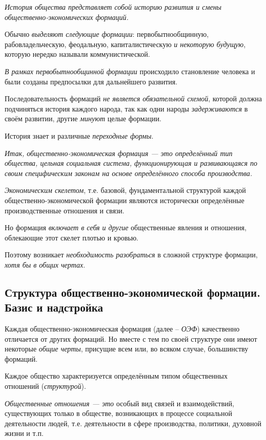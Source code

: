 \documentclass[a4paper,14pt,russian]{extreport}
\begin{document}
\emph{История общества представляет собой историю развития и смены общественно-экономических формаций.}

Обычно \emph{выделяют следующие формации}: первобытнообщинную, рабовладельческую, феодальную, капиталистическую \emph{и некоторую будущую}, которую нередко называли коммунистической.

\emph{В рамках первобытнообщинной формации} происходило становление человека и были созданы предпосылки для дальнейшего развития.

Последовательность формаций \emph{не является обязательной схемой}, которой должна подчиняться история каждого народа, так как одни народы \emph{задерживаются} в своём развитии, другие \emph{минуют} целые формации.

История знает и различные \emph{переходные формы}.

\emph{Итак, общественно-экономическая формация --- это определённый тип общества, цельная социальная система, функционирующая и развивающаяся по своим специфическим законам на основе определённого способа производства.}

\emph{Экономическим скелетом}, т.е. базовой, фундаментальной структурой каждой общественно-экономической формации являются исторически определённые производственные отношения и связи.

Но формация \emph{включает в себя и другие} общественные явления и отношения, облекающие этот скелет плотью и кровью.

Поэтому возникает \emph{необходимость разобраться} в сложной структуре формации, \emph{хотя бы в общих чертах}.

\subsection{Структура общественно-экономической формации. Базис и надстройка}

Каждая общественно-экономическая формация (далее -- \emph{ОЭФ}) качественно отличается от других формаций. Но вместе с тем по своей структуре они имеют некоторые \emph{общие черты}, присущие всем или, во всяком случае, большинству формаций.

Каждое общество характеризуется определённым типом общественных отношений (\emph{структурой}).

\emph{Общественные отношения --- это} особый вид связей и взаимодействий, существующих только в обществе, возникающих в процессе социальной деятельности людей, т.е. деятельности в сфере производства, политики, духовной жизни и т.п.
\end{document}
